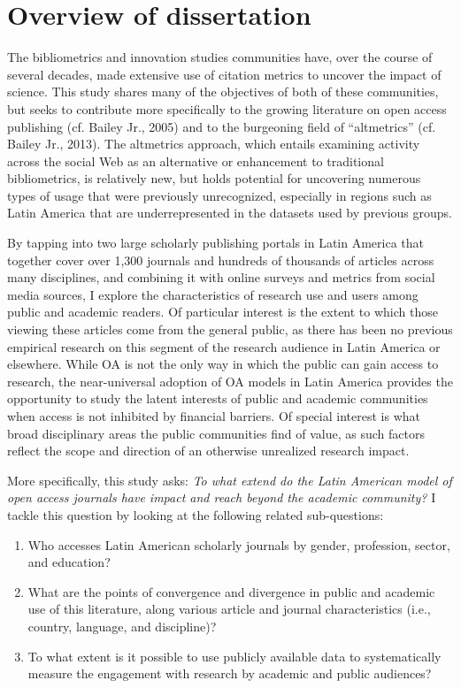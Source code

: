 \section{Overview of dissertation}
\label{overviewofdissertation}

The bibliometrics and innovation studies communities have, over the course of several decades, made extensive use of citation metrics to uncover the impact of science. This study shares many of the objectives of both of these communities, but seeks to contribute more specifically to the growing literature on open access publishing (cf. Bailey Jr., 2005) and to the burgeoning field of ``altmetrics'' (cf. Bailey Jr., 2013). The altmetrics approach, which entails examining activity across the social Web as an alternative or enhancement to traditional bibliometrics, is relatively new, but holds potential for uncovering numerous types of usage that were previously unrecognized, especially in regions such as Latin America that are underrepresented in the datasets used by previous groups.

By tapping into two large scholarly publishing portals in Latin America that together cover over 1,300 journals and hundreds of thousands of articles across many disciplines, and combining it with online surveys and metrics from social media sources, I explore the characteristics of research use and users among public and academic readers. Of particular interest is the extent to which those viewing these articles come from the general public, as there has been no previous empirical research on this segment of the research audience in Latin America or elsewhere. While OA is not the only way in which the public can gain access to research, the near-universal adoption of OA models in Latin America provides the opportunity to study the latent interests of public and academic communities when access is not inhibited by financial barriers. Of special interest is what broad disciplinary areas the public communities find of value, as such factors reflect the scope and direction of an otherwise unrealized research impact.

More specifically, this study asks: \emph{To what extend do the Latin American model of open access journals have impact and reach beyond the academic community?} I tackle this question by looking at the following related sub-questions:

\begin{enumerate}
\item Who accesses Latin American scholarly journals by gender, profession, sector, and education?

\item What are the points of convergence and divergence in public and academic use of this literature, along various article and journal characteristics (i.e., country, language, and discipline)?

\item To what extent is it possible to use publicly available data to systematically measure the engagement with research by academic and public audiences?

\end{enumerate}

